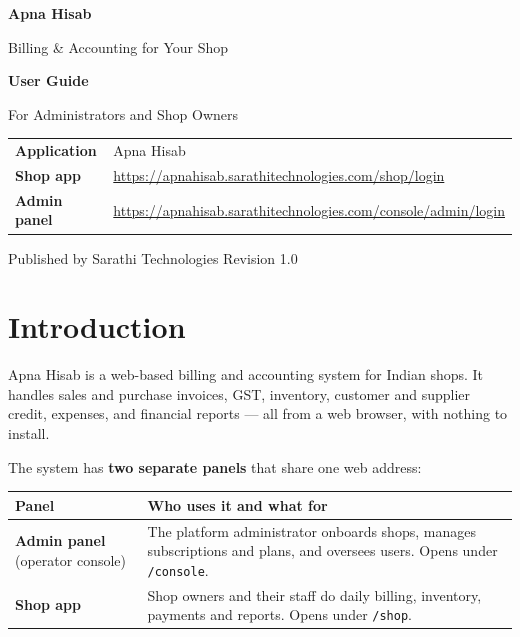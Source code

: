 \documentclass[11pt,a4paper]{article}
\newcommand{\role}[1]{\textbf{\color{brand}#1}}
\begin{document}
\begin{titlepage}
\centering
\vspace*{3cm}
{\Huge\bfseries\color{brand} Apna Hisab\par}
\vspace{0.4cm}
{\Large Billing \& Accounting for Your Shop\par}
\vspace{1.2cm}
{\LARGE\bfseries User Guide\par}
\vspace{0.3cm}
{\large For Administrators and Shop Owners\par}
\vspace{2cm}
\begin{tabular}{@{}ll@{}}
\textbf{Application} & Apna Hisab \\
\textbf{Shop app}    & \url{https://apnahisab.sarathitechnologies.com/shop/login} \\
\textbf{Admin panel} & \url{https://apnahisab.sarathitechnologies.com/console/admin/login} \\
\end{tabular}
\vfill
{\color{muted}\small Published by Sarathi Technologies \textbullet{} Revision 1.0\par}
\end{titlepage}

\tableofcontents
\clearpage

\section{Introduction}

Apna Hisab is a web-based billing and accounting system for Indian shops. It
handles sales and purchase invoices, GST, inventory, customer and supplier
credit, expenses, and financial reports --- all from a web browser, with nothing
to install.

The system has \textbf{two separate panels} that share one web address:

\begin{center}
\begin{tabularx}{\textwidth}{@{}p{}L@{}}
\toprule
\textbf{Panel} & \textbf{Who uses it and what for} \\
\midrule
\role{Admin panel} (operator console) &
The platform administrator onboards shops, manages subscriptions and plans,
and oversees users. Opens under \texttt{/console}. \\[4pt]
\role{Shop app} &
Shop owners and their staff do daily billing, inventory, payments and reports.
Opens under \texttt{/shop}. \\
\bottomrule
\end{tabularx}
\end{center}
\end{document}
